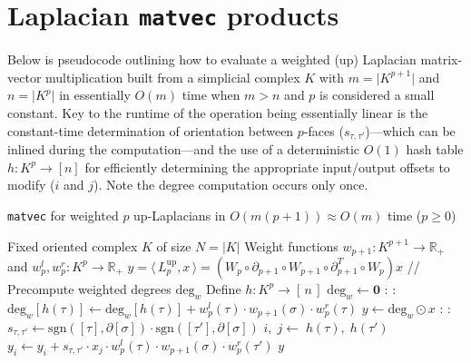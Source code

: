 \documentclass[10pt]{article}
\numberwithin{equation}{section}
\newcommand{\+}{%
	\raisebox{0.18ex}{\scaleobj{0.55}{+}}
}
\theoremstyle{definition}
\theoremstyle{definition}
\begin{document}
\section{Laplacian \texttt{matvec} products}\label{sec:up_laplace_matvec}
Below is pseudocode outlining how to evaluate a weighted (up) Laplacian matrix-vector multiplication built from a simplicial complex $K$ with $m = \lvert K^{p+1} \rvert$ and $n = \lvert K^{p} \rvert$ in essentially $O(m)$ time when $m > n$ and $p$ is considered a small constant. 
Key to the runtime of the operation being essentially linear is the constant-time determination of orientation between $p$-faces ($s_{\tau, \tau'}$)---which can be inlined during the computation---and the use of a deterministic $O(1)$ hash table $h : K^{p} \to [n]$ for efficiently determining the appropriate input/output offsets to modify ($i$ and $j$). 
Note the degree computation occurs only once. 

\begin{algorithm}[H]\label{alg:lap_matvec}
\renewcommand{\algorithmicensure}{\textbf{Optional:}}
\caption{\texttt{matvec} for weighted $p$ up-Laplacians in $O(m(p+1)) \approx O(m)$ time ($p \geq 0$)}
\begin{algorithmic}[1]
\Require Fixed oriented complex $K$ of size $N=\lvert K \rvert$ 
\Ensure Weight functions $w_{p+1}: K^{p+1} \to \mathbb{R}_{+}$ and  $w_{p}^l, w_{p}^r: K^p \to \mathbb{R}_{+}$
\renewcommand{\algorithmicensure}{\textbf{Output:}}
\Ensure $y = \langle \, L_p^{\mathrm{up}}, x \, \rangle =  (W_p \circ \partial_{p+1} \circ W_{p+1} \circ \partial_{p+1}^T \circ W_p)x$
\State // Precompute weighted degrees $\mathrm{deg}_w$ 
\State Define $h : K^p \to [ \, n \, ]$ 
\State $\mathrm{deg}_w \gets \mathbf{0}$
: 
	\For{$\tau \in \partial[\sigma]$}:
   	 	\State $\mathrm{deg}_w[h(\tau)] \gets \mathrm{deg}_w[h(\tau)] + w_p^l(\tau) \cdot w_{p+1}(\sigma) \cdot  w_{p}^r(\tau)$
   	\EndFor
\EndFor
\State 
\State $y \gets \mathrm{deg}_w \odot x$ \; 
:
    : 
    		\State $s_{\tau, \tau'} \gets \mathrm{sgn}([\tau], \partial[\sigma]) \cdot \mathrm{sgn}([\tau'], \partial[\sigma])$
    		\State $i, \; j \gets \; h(\tau), \; h(\tau')$
    		\State $y_i \gets y_i + s_{\tau, \tau'} \cdot x_{j} \cdot w_p^l(\tau) \cdot w_{p+1}(\sigma) \cdot w_p^r(\tau')$
    \EndFor 
\EndFor
\State \Return $y$
\EndFunction
\end{algorithmic}
\end{algorithm}
\end{document}
